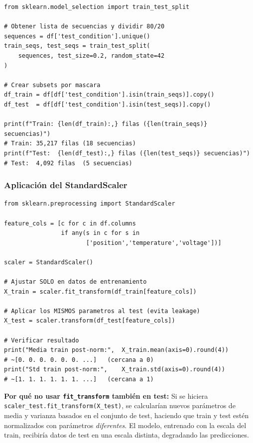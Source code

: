 \documentclass[12pt,a4paper]{article}
\begin{document}
\begin{lstlisting}[caption={Split train/test a nivel de secuencia}, label={lst:split}]
from sklearn.model_selection import train_test_split

# Obtener lista de secuencias y dividir 80/20
sequences = df['test_condition'].unique()
train_seqs, test_seqs = train_test_split(
    sequences, test_size=0.2, random_state=42
)

# Crear subsets por mascara
df_train = df[df['test_condition'].isin(train_seqs)].copy()
df_test  = df[df['test_condition'].isin(test_seqs)].copy()

print(f"Train: {len(df_train):,} filas ({len(train_seqs)} secuencias)")
# Train: 35,217 filas (18 secuencias)
print(f"Test:  {len(df_test):,} filas ({len(test_seqs)} secuencias)")
# Test:  4,092 filas  (5 secuencias)
\end{lstlisting}

\subsubsection{Aplicación del StandardScaler}

\begin{lstlisting}[caption={Ajuste y transformación con StandardScaler}, label={lst:scaler}]
from sklearn.preprocessing import StandardScaler

feature_cols = [c for c in df.columns
                if any(s in c for s in
                       ['position','temperature','voltage'])]

scaler = StandardScaler()

# Ajustar SOLO en datos de entrenamiento
X_train = scaler.fit_transform(df_train[feature_cols])

# Aplicar los MISMOS parametros al test (evita leakage)
X_test = scaler.transform(df_test[feature_cols])

# Verificar resultado
print("Media train post-norm:",  X_train.mean(axis=0).round(4))
# ~[0. 0. 0. 0. 0. 0. ...]   (cercana a 0)
print("Std train post-norm:",    X_train.std(axis=0).round(4))
# ~[1. 1. 1. 1. 1. 1. ...]   (cercana a 1)
\end{lstlisting}

\textbf{Por qué no usar \texttt{fit\_transform} también en test:}
Si se hiciera \texttt{scaler\_test.fit\_transform(X\_test)}, se calcularían
nuevos parámetros de media y varianza basados en el conjunto de test, haciendo
que train y test estén normalizados con parámetros \emph{diferentes}. El modelo,
entrenado con la escala del train, recibiría datos de test en una escala distinta,
degradando las predicciones.
\end{document}
